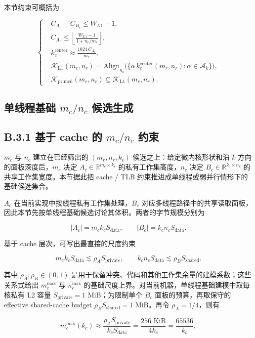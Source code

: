 \documentclass[a4paper,11pt,oneside]{article}
\begin{document}
本节约束可概括为

$$
\left\{
\begin{aligned}
&C_{A_r} + C_{B_r} \le W_{L1} - 1,\\
&C_{A_r} \le \left\lfloor \frac{W_{L1}-1}{1+n_r/m_r} \right\rfloor,\\
&k_c^{\text{center}} \approx \frac{1024\,C_{A_r}}{m_r},\\
&\mathcal{K}_{\mathrm{L1}}(m_r,n_r) = \mathrm{Align}_{g_k}\bigl(\{ \alpha\, k_c^{\text{center}}(m_r,n_r) : \alpha \in \mathcal{A}_k \}\bigr),\\
&\mathcal{K}_{\mathrm{pruned}}(m_r,n_r) \subseteq \mathcal{K}_{\mathrm{L1}}(m_r,n_r).
\end{aligned}
\right.
$$

\subsection{单线程基础 $m_c/n_c$ 候选生成}

\subsection*{B.3.1 基于 cache 的 $m_c/n_c$ 约束}

$m_c$ 与 $n_c$ 建立在已经筛出的 $(m_r,n_r,k_c)$ 候选之上：给定微内核形状和沿 $k$ 方向的面板深度后，$m_c$ 决定 $A_c \in \mathbb{R}^{m_c \times k_c}$ 的私有工作集高度，$n_c$ 决定 $B_c \in \mathbb{R}^{k_c \times n_c}$ 的共享工作集宽度。本节据此把 cache / TLB 约束推进成单线程或弱并行情形下的基础候选集合。

$A_c$ 在当前实现中按线程私有工作集处理，$B_c$ 对应多线程路径中的共享读取面板，因此本节先按单线程基础候选讨论其体积。两者的字节规模分别为

$$
|A_c| = m_c k_c S_{\text{data}},
\qquad
|B_c| = k_c n_c S_{\text{data}}.
$$

基于 cache 层次，可写出最直接的尺度约束

$$
m_c k_c S_{\text{data}} \lesssim \rho_A S_{\text{private}},
\qquad
k_c n_c S_{\text{data}} \lesssim \rho_B S_{\text{shared}}.
$$

其中 $\rho_A,\rho_B \in (0,1)$ 是用于保留冲突、代码和其他工作集余量的建模系数；这些关系式给出 $m_c^{\max}$ 与 $n_c^{\max}$ 的基础尺度上界。对当前机器，单线程基础建模中取每核私有 L2 容量 $S_{\text{private}}=1\text{ MiB}$；为限制单个 $B_c$ 面板的预算，再取保守的 effective shared-cache budget $\rho_B S_{\text{shared}} = 1\text{ MiB}$。再令 $\rho_A = 1/4$，则有

$$
m_c^{\max}(k_c) \approx \frac{\rho_A S_{\text{private}}}{k_c S_{\text{data}}}
= \frac{256\text{ KiB}}{4k_c}
= \frac{65536}{k_c},
$$
\end{document}
